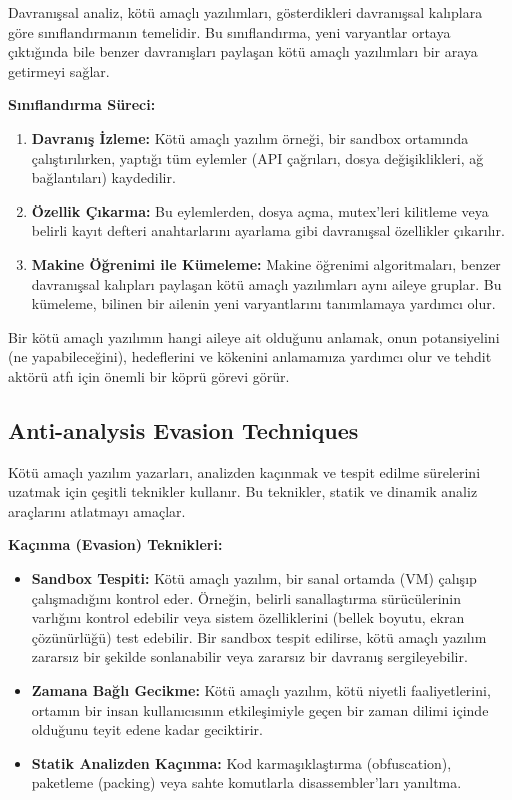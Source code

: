 Davranışsal analiz, kötü amaçlı yazılımları, gösterdikleri davranışsal kalıplara göre sınıflandırmanın temelidir. Bu sınıflandırma, yeni varyantlar ortaya çıktığında bile benzer davranışları paylaşan kötü amaçlı yazılımları bir araya getirmeyi sağlar.

\textbf{Sınıflandırma Süreci:}
\begin{enumerate}
    \item \textbf{Davranış İzleme:} Kötü amaçlı yazılım örneği, bir sandbox ortamında çalıştırılırken, yaptığı tüm eylemler (API çağrıları, dosya değişiklikleri, ağ bağlantıları) kaydedilir.
    \item \textbf{Özellik Çıkarma:} Bu eylemlerden, dosya açma, mutex'leri kilitleme veya belirli kayıt defteri anahtarlarını ayarlama gibi davranışsal özellikler çıkarılır.
    \item \textbf{Makine Öğrenimi ile Kümeleme:} Makine öğrenimi algoritmaları, benzer davranışsal kalıpları paylaşan kötü amaçlı yazılımları aynı aileye gruplar. Bu kümeleme, bilinen bir ailenin yeni varyantlarını tanımlamaya yardımcı olur.
\end{enumerate}

Bir kötü amaçlı yazılımın hangi aileye ait olduğunu anlamak, onun potansiyelini (ne yapabileceğini), hedeflerini ve kökenini anlamamıza yardımcı olur ve tehdit aktörü atfı için önemli bir köprü görevi görür.

\subsection{Anti-analysis Evasion Techniques}

Kötü amaçlı yazılım yazarları, analizden kaçınmak ve tespit edilme sürelerini uzatmak için çeşitli teknikler kullanır. Bu teknikler, statik ve dinamik analiz araçlarını atlatmayı amaçlar.

\textbf{Kaçınma (Evasion) Teknikleri:}
\begin{itemize}
    \item \textbf{Sandbox Tespiti:} Kötü amaçlı yazılım, bir sanal ortamda (VM) çalışıp çalışmadığını kontrol eder. Örneğin, belirli sanallaştırma sürücülerinin varlığını kontrol edebilir veya sistem özelliklerini (bellek boyutu, ekran çözünürlüğü) test edebilir. Bir sandbox tespit edilirse, kötü amaçlı yazılım zararsız bir şekilde sonlanabilir veya zararsız bir davranış sergileyebilir.
    \item \textbf{Zamana Bağlı Gecikme:} Kötü amaçlı yazılım, kötü niyetli faaliyetlerini, ortamın bir insan kullanıcısının etkileşimiyle geçen bir zaman dilimi içinde olduğunu teyit edene kadar geciktirir.
    \item \textbf{Statik Analizden Kaçınma:} Kod karmaşıklaştırma (obfuscation), paketleme (packing) veya sahte komutlarla disassembler'ları yanıltma.
\end{itemize}

